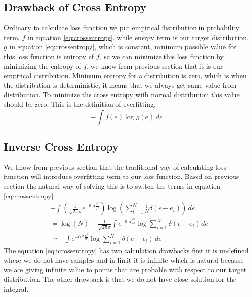 \documentclass[conference]{IEEEtran}
\begin{document}
\subsection{Drawback of Cross Entropy}
Ordinary to calculate loss function we put empirical distribution in probability term, $f$ in equation \ref{eq:crossentropy},
while energy term is our target distribution, $g$ in equation \ref{eq:crossentropy}, which is constant, minimum possible value
for this loss function is entropy of $f$, so we can minimize this loss function by minimizing the  entropy of $f$, 
we know from previous section that it is our empirical distribution. Minimum entropy for a distribution is
zero, which is when the distribution is deterministic, it means that we always get same value from distribution.
To minimize the cross entropy with normal distribution this value should be zero. This is  the definition of overfitting.
\begin{equation}
    -\int f(e) \log{g(e)} \,de
    \label{eq:crossentropy}
\end{equation}
\subsection{Inverse Cross Entropy}
We know from previous section that the traditional way of calculating loss function will introduce overfitting term to
our loss function. Based on previous section the natural way of solving this is to switch the terms in equation
\ref{eq:crossentropy}.
\begin{equation}
    \begin{split}
        &-\int(\frac{1}{\sqrt{2\pi}\sigma}e^{-0.5\frac{e^2}{\sigma^2}}) \log{(\sum_{i = 1}^{N}\frac{1}{N}\delta(e-e_i))}  \,de\\
        & = \log{(N)} - \frac{1}{\sqrt{2\pi}\sigma} \int e^{-0.5\frac{e^2}{\sigma^2}} \log{\sum_{i = 1}^{N}\delta(e-e_i)}  \,de\\
        & \simeq - \int e^{-0.5\frac{e^2}{\sigma^2}} \log{\sum_{i = 1}^{N}\delta(e-e_i)}  \,de
    \end{split}
    \label{eq:icrossentropy}
\end{equation}
The equation \ref{eq:icrossentropy} has two calculation drawbacks first it is 
undefined where we do not have samples and in limit it is infinite which is natural
because we are giving infinite value to points that are probable with respect to our
target distribution. The other drawback is that we do not have close solution for the
integral.
\end{document}
